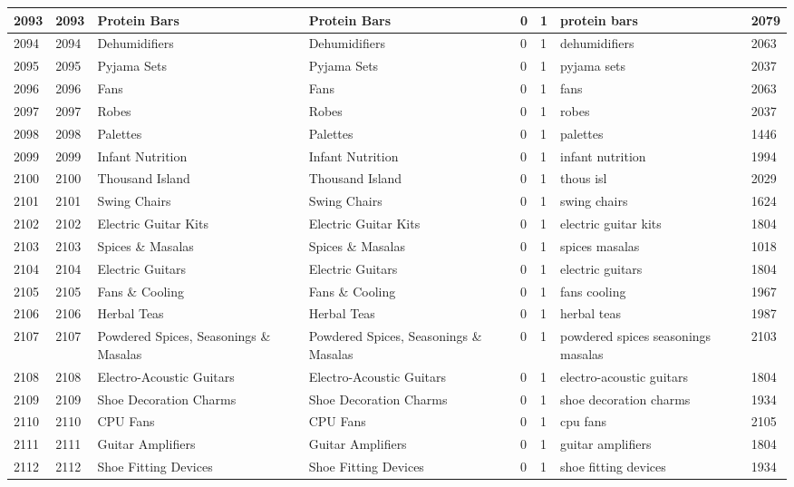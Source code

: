 \begin{longtable}{|l|l|l|l|l|l|l|l|}
2093 & 2093 & Protein Bars & Protein Bars & 0 & 1 & protein bars & 2079 \\ \hline 
2094 & 2094 & Dehumidifiers & Dehumidifiers & 0 & 1 & dehumidifiers & 2063 \\ \hline 
2095 & 2095 & Pyjama Sets & Pyjama Sets & 0 & 1 & pyjama sets & 2037 \\ \hline 
2096 & 2096 & Fans & Fans & 0 & 1 & fans & 2063 \\ \hline 
2097 & 2097 & Robes & Robes & 0 & 1 & robes & 2037 \\ \hline 
2098 & 2098 & Palettes & Palettes & 0 & 1 & palettes & 1446 \\ \hline 
2099 & 2099 & Infant Nutrition & Infant Nutrition & 0 & 1 & infant nutrition & 1994 \\ \hline 
2100 & 2100 & Thousand Island & Thousand Island & 0 & 1 & thous isl  & 2029 \\ \hline 
2101 & 2101 & Swing Chairs & Swing Chairs & 0 & 1 & swing chairs & 1624 \\ \hline 
2102 & 2102 & Electric Guitar Kits & Electric Guitar Kits & 0 & 1 & electric guitar kits & 1804 \\ \hline 
2103 & 2103 & Spices \& Masalas & Spices \& Masalas & 0 & 1 & spices masalas & 1018 \\ \hline 
2104 & 2104 & Electric Guitars & Electric Guitars & 0 & 1 & electric guitars & 1804 \\ \hline 
2105 & 2105 & Fans \& Cooling & Fans \& Cooling & 0 & 1 & fans cooling & 1967 \\ \hline 
2106 & 2106 & Herbal Teas & Herbal Teas & 0 & 1 & herbal teas & 1987 \\ \hline 
2107 & 2107 & Powdered Spices, Seasonings \& Masalas & Powdered Spices, Seasonings \& Masalas & 0 & 1 & powdered spices seasonings masalas & 2103 \\ \hline 
2108 & 2108 & Electro-Acoustic Guitars & Electro-Acoustic Guitars & 0 & 1 & electro-acoustic guitars & 1804 \\ \hline 
2109 & 2109 & Shoe Decoration Charms & Shoe Decoration Charms & 0 & 1 & shoe decoration charms & 1934 \\ \hline 
2110 & 2110 & CPU Fans & CPU Fans & 0 & 1 & cpu fans & 2105 \\ \hline 
2111 & 2111 & Guitar Amplifiers & Guitar Amplifiers & 0 & 1 & guitar amplifiers & 1804 \\ \hline 
2112 & 2112 & Shoe Fitting Devices & Shoe Fitting Devices & 0 & 1 & shoe fitting devices & 1934 \\ \hline 

\end{longtable}
